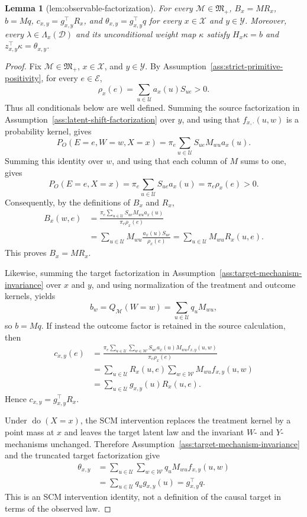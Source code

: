 \documentclass{article}
\newtheorem{lemma}{Lemma}
\begin{document}
\begin{lemma}[lem:observable-factorization]\label{lem:observable-factorization}
For every \(\mathcal M\in\mathfrak M_{+}\), \(B_x=MR_x\), \(b=Mq\), \(c_{x,y}=g_{x,y}^{\top}R_x\), and \(\theta_{x,y}=g_{x,y}^{\top}q\) for every \(x\in\mathcal X\) and \(y\in\mathcal Y\). Moreover, every \(\lambda\in\Lambda_x(\mathcal D)\) and its unconditional weight map \(\kappa\) satisfy \(H_x\kappa=b\) and \(z_{x,y}^{\top}\kappa=\theta_{x,y}\).
\end{lemma}
\begin{proof}
Fix \(\mathcal M\in\mathfrak M_{+}\), \(x\in\mathcal X\), and \(y\in\mathcal Y\).  By Assumption~\ref{ass:strict-primitive-positivity}, for every \(e\in\mathcal E\),
\[
\rho_x(e)=\sum_{u\in\mathcal U}a_x(u)S_{ue}>0.
\]
Thus all conditionals below are well defined.  Summing the source factorization in Assumption~\ref{ass:latent-shift-factorization} over \(y\), and using that \(f_{x,\cdot}(u,w)\) is a probability kernel, gives
\[
P_O(E=e,W=w,X=x)
=\pi_e\sum_{u\in\mathcal U}S_{ue}M_{wu}a_x(u).
\]
Summing this identity over \(w\), and using that each column of \(M\) sums to one, gives
\[
P_O(E=e,X=x)=\pi_e\sum_{u\in\mathcal U}S_{ue}a_x(u)
=\pi_e\rho_x(e)>0.
\]
Consequently, by the definitions of \(B_x\) and \(R_x\),
\[
\begin{aligned}
B_x(w,e)
&=\frac{\pi_e\sum_{u\in\mathcal U}S_{ue}M_{wu}a_x(u)}
        {\pi_e\rho_x(e)}\\
&=\sum_{u\in\mathcal U}M_{wu}
  \frac{a_x(u)S_{ue}}{\rho_x(e)}
=\sum_{u\in\mathcal U}M_{wu}R_x(u,e).
\end{aligned}
\]
This proves \(B_x=MR_x\).

Likewise, summing the target factorization in Assumption~\ref{ass:target-mechanism-invariance} over \(x\) and \(y\), and using normalization of the treatment and outcome kernels, yields
\[
b_w=Q_{\mathcal M}(W=w)
=\sum_{u\in\mathcal U}q_uM_{wu},
\]
so \(b=Mq\).  If instead the outcome factor is retained in the source calculation, then
\[
\begin{aligned}
c_{x,y}(e)
&=\frac{\pi_e\sum_{u\in\mathcal U}\sum_{w\in\mathcal W}
 S_{ue}a_x(u)M_{wu}f_{x,y}(u,w)}
 {\pi_e\rho_x(e)}\\
&=\sum_{u\in\mathcal U}R_x(u,e)
  \sum_{w\in\mathcal W}M_{wu}f_{x,y}(u,w)\\
&=\sum_{u\in\mathcal U}g_{x,y}(u)R_x(u,e).
\end{aligned}
\]
Hence \(c_{x,y}=g_{x,y}^{\top}R_x\).

Under \(\operatorname{do}(X=x)\), the SCM intervention replaces the treatment kernel by a point mass at \(x\) and leaves the target latent law and the invariant \(W\)- and \(Y\)-mechanisms unchanged.  Therefore Assumption~\ref{ass:target-mechanism-invariance} and the truncated target factorization give
\[
\begin{aligned}
\theta_{x,y}
&=\sum_{u\in\mathcal U}\sum_{w\in\mathcal W}
  q_uM_{wu}f_{x,y}(u,w)\\
&=\sum_{u\in\mathcal U}q_ug_{x,y}(u)
=g_{x,y}^{\top}q.
\end{aligned}
\]
This is an SCM intervention identity, not a definition of the causal target in terms of the observed law.


\end{proof}
\end{document}
